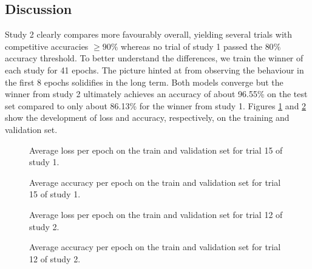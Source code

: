 \documentclass[british,12p]{article}
\begin{document}
	\subsection{Discussion}
    Study 2 clearly compares more favourably overall, yielding several trials with competitive accuracies $\ge 90\%$ whereas no trial of study 1 passed the $80\%$ accuracy threshold. To better understand the differences, we train the winner of each study for 41 epochs. The picture hinted at from observing the behaviour in the first 8 epochs solidifies in the long term. Both models converge but the winner from study 2 ultimately achieves an accuracy of about 96.55\% on the test set compared to only about 86.13\% for the winner from study 1. Figures \ref{fig-trial-1-15-loss} and \ref{fig-trial-1-15-acc} show the development of loss and accuracy, respectively, on the training and validation set. 
    \begin{figure}[h!]
    	\begin{center}
  			\caption{Average loss per epoch on the train and validation set for trial 15 of study 1.}
  			\label{fig-trial-1-15-loss}
  		\end{center}
	\end{figure}
	\begin{figure}[h!]
		\begin{center}
  			\caption{Average accuracy per epoch on the train and validation set for trial 15 of study 1.}
  			\label{fig-trial-1-15-acc}
  		\end{center}
	\end{figure}
	
	\begin{figure}[h!]
    	\begin{center}
  			\caption{Average loss per epoch on the train and validation set for trial 12 of study 2.}
  			\label{fig-trial-2-12-loss}
  		\end{center}
	\end{figure}
	\begin{figure}[h!]
		\begin{center}
  			\caption{Average accuracy per epoch on the train and validation set for trial 12 of study 2.}
  			\label{fig-trial-2-12-acc}
  		\end{center}
	\end{figure}
\end{document}
